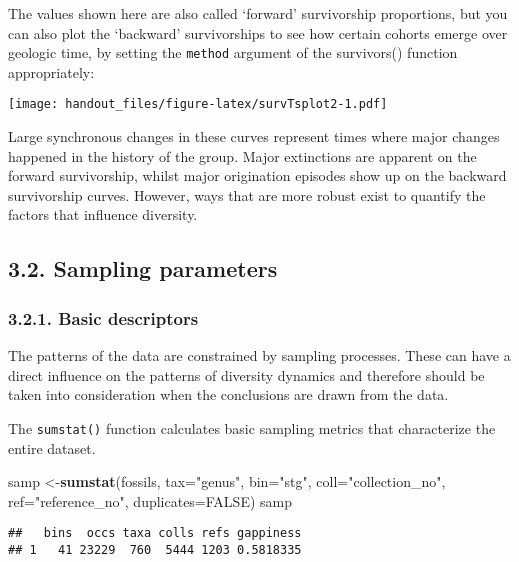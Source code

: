 \documentclass[]{article}
\newenvironment{Shaded}{\begin{snugshade}}{\end{snugshade}}
\newcommand{\KeywordTok}[1]{\textcolor[rgb]{0.13,0.29,0.53}{\textbf{{#1}}}}
\newcommand{\DataTypeTok}[1]{\textcolor[rgb]{0.13,0.29,0.53}{{#1}}}
\newcommand{\StringTok}[1]{\textcolor[rgb]{0.31,0.60,0.02}{{#1}}}
\newcommand{\OtherTok}[1]{\textcolor[rgb]{0.56,0.35,0.01}{{#1}}}
\newcommand{\NormalTok}[1]{{#1}}
\begin{document}
The values shown here are also called `forward' survivorship
proportions, but you can also plot the `backward' survivorships to see
how certain cohorts emerge over geologic time, by setting the
\texttt{method} argument of the survivors() function appropriately:

\texttt{[image: handout\_files/figure-latex/survTsplot2-1.pdf]}

Large synchronous changes in these curves represent times where major
changes happened in the history of the group. Major extinctions are
apparent on the forward survivorship, whilst major origination episodes
show up on the backward survivorship curves. However, ways that are more
robust exist to quantify the factors that influence diversity.

\subsection{3.2. Sampling parameters}\label{sampling-parameters}

\subsubsection{3.2.1. Basic descriptors}\label{basic-descriptors}

The patterns of the data are constrained by sampling processes. These
can have a direct influence on the patterns of diversity dynamics and
therefore should be taken into consideration when the conclusions are
drawn from the data.

The \texttt{sumstat()} function calculates basic sampling metrics that
characterize the entire dataset.

\begin{Shaded}
\begin{Highlighting}[]
\NormalTok{samp <-}\KeywordTok{sumstat}\NormalTok{(fossils, }\DataTypeTok{tax=}\StringTok{"genus"}\NormalTok{, }\DataTypeTok{bin=}\StringTok{"stg"}\NormalTok{, }
  \DataTypeTok{coll=}\StringTok{"collection_no"}\NormalTok{, }\DataTypeTok{ref=}\StringTok{"reference_no"}\NormalTok{, }\DataTypeTok{duplicates=}\OtherTok{FALSE}\NormalTok{)}
\NormalTok{samp}
\end{Highlighting}
\end{Shaded}

\begin{verbatim}
##   bins  occs taxa colls refs gappiness
## 1   41 23229  760  5444 1203 0.5818335
\end{verbatim}
\end{document}
